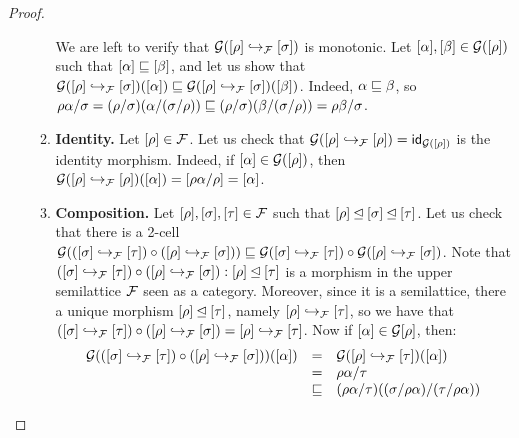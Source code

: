 \begin{proof}
\begin{enumerate}
\begin{enumerate}
    We are left to verify that $\mathcal{G}({[\rho]} \hookrightarrow_{\mathcal{F}} {[\sigma]})$ is monotonic.
    Let ${[\alpha]}, {[\beta]} \in \mathcal{G}([\rho])$
    such that ${[\alpha]} \sqsubseteq {[\beta]}$, and let us show that
    $\mathcal{G}({[\rho]} \hookrightarrow_{\mathcal{F}} {[\sigma]})({[\alpha]}) \sqsubseteq \mathcal{G}([\rho] \hookrightarrow_{\mathcal{F}} [\sigma])({[\beta]})$.
    Indeed, $\alpha \sqsubseteq \beta$, so
    $
      \rho\alpha/\sigma
      = (\rho/\sigma)(\alpha/(\sigma/\rho))
      \sqsubseteq (\rho/\sigma)(\beta/(\sigma/\rho))
      = \rho\beta/\sigma
    $.
  \item {\bf Identity.}
    Let ${[\rho]} \in \mathcal{F}$.
    Let us check that $\mathcal{G}({[\rho]} \hookrightarrow_{\mathcal{F}} {[\rho]}) = \mathsf{id}_{\mathcal{G}({[\rho]})}$
    is the identity morphism.
    Indeed, if ${[\alpha]} \in \mathcal{G}({[\rho]})$,
    then $\mathcal{G}({[\rho]} \hookrightarrow_{\mathcal{F}} {[\rho]})({[\alpha]}) = {[\rho\alpha/\rho]} = {[\alpha]}$.
  \item {\bf Composition.}
    Let ${[\rho]}, {[\sigma]}, {[\tau]} \in \mathcal{F}$
    such that ${[\rho]} \unlhd {[\sigma]} \unlhd {[\tau]}$.
    Let us check that there is a 2-cell
    $\mathcal{G}(({[\sigma]} \hookrightarrow_{\mathcal{F}} {[\tau]}) \circ ({[\rho]} \hookrightarrow_{\mathcal{F}} {[\sigma]})) \sqsubseteq
     \mathcal{G}({[\sigma]} \hookrightarrow_{\mathcal{F}} {[\tau]}) \circ \mathcal{G}({[\rho]} \hookrightarrow_{\mathcal{F}} {[\sigma]})$.
    Note that
    $({[\sigma]} \hookrightarrow_{\mathcal{F}} {[\tau]}) \circ ({[\rho]} \hookrightarrow_{\mathcal{F}} {[\sigma]}) : {[\rho]} \unlhd {[\tau]}$
    is a morphism in the upper semilattice $\mathcal{F}$ seen as a category.
    Moreover, since it is a semilattice, there a unique morphism ${[\rho]} \unlhd {[\tau]}$,
    namely ${[\rho]} \hookrightarrow_{\mathcal{F}} {[\tau]}$, so we have that
    $
      ({[\sigma]} \hookrightarrow_{\mathcal{F}} {[\tau]}) \circ ({[\rho]} \hookrightarrow_{\mathcal{F}} {[\sigma]}) = {[\rho]} \hookrightarrow_{\mathcal{F}} {[\tau]}
    $.
    Now if ${[\alpha]} \in \mathcal{G}{{[\rho]}}$, then:
    \[
      \begin{array}{rcll}
      \mathcal{G}(({[\sigma]} \hookrightarrow_{\mathcal{F}} {[\tau]}) \circ ({[\rho]} \hookrightarrow_{\mathcal{F}} {[\sigma]}))({[\alpha]})
      & = & \mathcal{G}({[\rho]} \hookrightarrow_{\mathcal{F}} {[\tau]})({[\alpha]}) \\
      & = & \rho\alpha/\tau \\
      & \sqsubseteq & (\rho\alpha/\tau)((\sigma/\rho\alpha)/(\tau/\rho\alpha)) \\

\end{array}\]
\end{enumerate}
\end{enumerate}
\end{proof}

